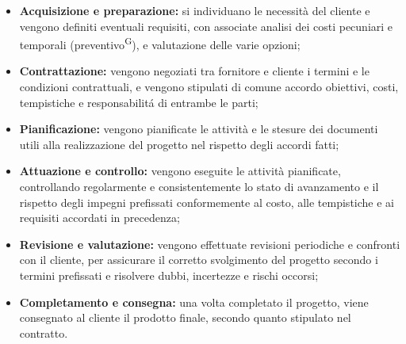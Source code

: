 \documentclass[8pt]{article}
\newcommand{\glossterm}[1]{#1\textsuperscript{G}} %
\begin{document}
\begin{itemize}
    \item \textbf{Acquisizione e preparazione:} si individuano le necessità del cliente e vengono definiti eventuali requisiti, con associate analisi dei costi pecuniari e temporali (\glossterm{preventivo}), e valutazione delle varie opzioni;
    \item \textbf{Contrattazione:} vengono negoziati tra fornitore e cliente i termini e le condizioni contrattuali, e vengono stipulati di comune accordo obiettivi, costi, tempistiche e responsabilitá di entrambe le parti;
    \item \textbf{Pianificazione:} vengono pianificate le attività e le stesure dei documenti utili alla realizzazione del progetto nel rispetto degli accordi fatti;
    \item \textbf{Attuazione e controllo:} vengono eseguite le attività pianificate, controllando regolarmente e consistentemente lo stato di avanzamento e il rispetto degli impegni prefissati conformemente al costo, alle tempistiche e ai requisiti accordati in precedenza;
    \item \textbf{Revisione e valutazione:} vengono effettuate revisioni periodiche e confronti con il cliente, per assicurare il corretto svolgimento del progetto secondo i termini prefissati e risolvere dubbi, incertezze e rischi occorsi;
    \item \textbf{Completamento e consegna:} una volta completato il progetto, viene consegnato al cliente il prodotto finale, secondo quanto stipulato nel contratto.
\end{itemize}
\end{document}
